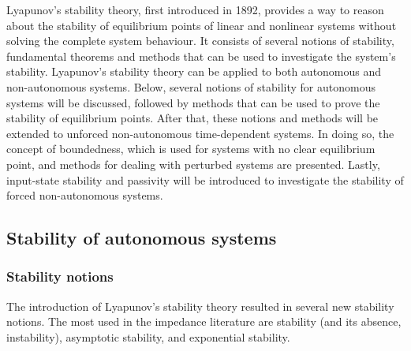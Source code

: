 Lyapunov's stability theory, first introduced in 1892, provides a way to reason about the stability of equilibrium points of linear and nonlinear systems without solving the complete system behaviour. It consists of several notions of stability, fundamental theorems and methods that can be used to investigate the system's stability. Lyapunov's stability theory can be applied to both autonomous and non-autonomous systems. Below, several notions of stability for autonomous systems will be discussed, followed by methods that can be used to prove the stability of equilibrium points. After that, these notions and methods will be extended to unforced non-autonomous time-dependent systems. In doing so, the concept of boundedness, which is used for systems with no clear equilibrium point, and methods for dealing with perturbed systems are presented. Lastly, input-state stability and passivity will be introduced to investigate the stability of forced non-autonomous systems.

\subsection{Stability of autonomous systems}

\subsubsection{Stability notions}

The introduction of Lyapunov's stability theory resulted in several new stability notions. The most used in the impedance literature are stability (and its absence, instability), asymptotic stability, and exponential stability.

